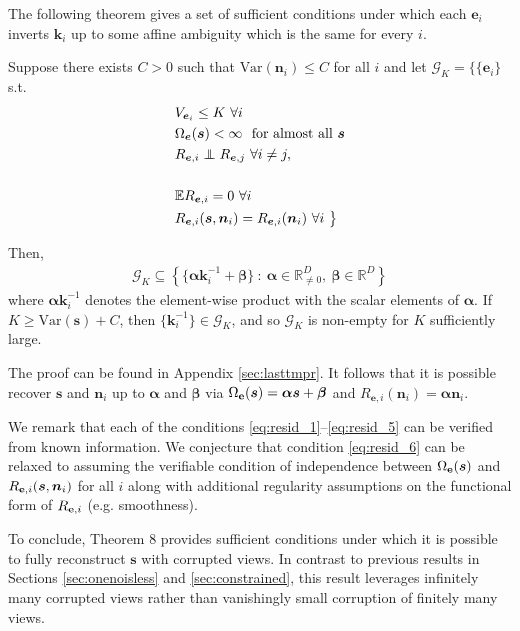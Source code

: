 The following theorem gives a set of sufficient conditions under which each $\bm{e}_i$ inverts $\bm{k}_i$ up to some affine ambiguity which is the same for every $i$.

\medskip

\begin{theorem}
	\label{thm:lastthm}
	Suppose there exists $C>0$ such that $\text{Var}(\bm{n}_i) \leq C$ for all $i$ and let $\mathcal{G}_K = \big\lbrace
	\{\bm{e}_i \}$ s.t.
	\begin{align}
	& V_{\bm{e}_i} \leq K \ \forall i \label{eq:resid_1}\\
	& \Omega_{\bm{e}}(\bm{s}) < \infty \  \text{ for almost all } \bm{s} \label{eq:resid_2}\\
	&R_{\bm{e}, i} \independent R_{\bm{e}, j} \ \forall i \not= j, \label{eq:resid_3}\\
	\\    &\mathbb{E} R_{\bm{e}, i} = 0 \ \forall i \label{eq:resid_5} \\
	&R_{\bm{e}, i}(\bm{s}, \bm{n}_i) = R_{\bm{e}, i}(\bm{n}_i) \ \forall i \ \big\rbrace \label{eq:resid_6}
	\end{align}
	
	Then,
	\begin{align*}
	\mathcal{G}_K \subseteq\left\lbrace \{ \bm{\alpha} \bm{k}^{-1}_i + \bm{\beta} \} \ : \ \bm{\alpha} \in \mathbb{R}^{D}_{\not=0}, \: \bm{\beta} \in \mathbb{R}^{D} \right\rbrace
	\end{align*}
	where $\bm\alpha \bm{k}^{-1}_i$ denotes the element-wise product with the scalar elements of $\bm{\alpha}$.
	If $K \geq \text{Var}(\bm{s}) + C$, then $ \{ \bm{k}^{-1}_i \}  \in \mathcal{G}_K$,
	and so $\mathcal{G}_K$ is non-empty for $K$ sufficiently large.
\end{theorem}
The proof can be found in Appendix \ref{sec:lasttmpr}.
It follows that it is possible recover $\bm{s}$ and $\bm{n}_i$ up to $\bm{\alpha}$ and $\bm{\beta}$ via $\Omega_{\mathbf{e}}(\bm{s}) = \bm{\alpha}\bm{s} + \bm{\beta}$ and $R_{\bm{e}, i}(\bm{n}_i) = \bm{\alpha}\bm{n}_i$.

We remark that each of the conditions \ref{eq:resid_1}--\ref{eq:resid_5} can be verified from known information.
We conjecture that condition \ref{eq:resid_6} can be relaxed to assuming the verifiable condition of independence between $\Omega_{\mathbf{e}}(\bm{s})$ and $R_{\mathbf{e}, i}(\bm{s}, \bm{n}_i)$ for all $i$ along with additional regularity assumptions on the functional form of $R_{\mathbf{e}, i}$ (e.g. smoothness).

To conclude, Theorem 8 provides sufficient conditions under which it is possible to fully reconstruct $\bm{s}$ with corrupted views.
In contrast to previous results in Sections \ref{sec:onenoisless} and \ref{sec:constrained}, this result leverages infinitely many corrupted views rather than vanishingly small corruption of finitely many views.







